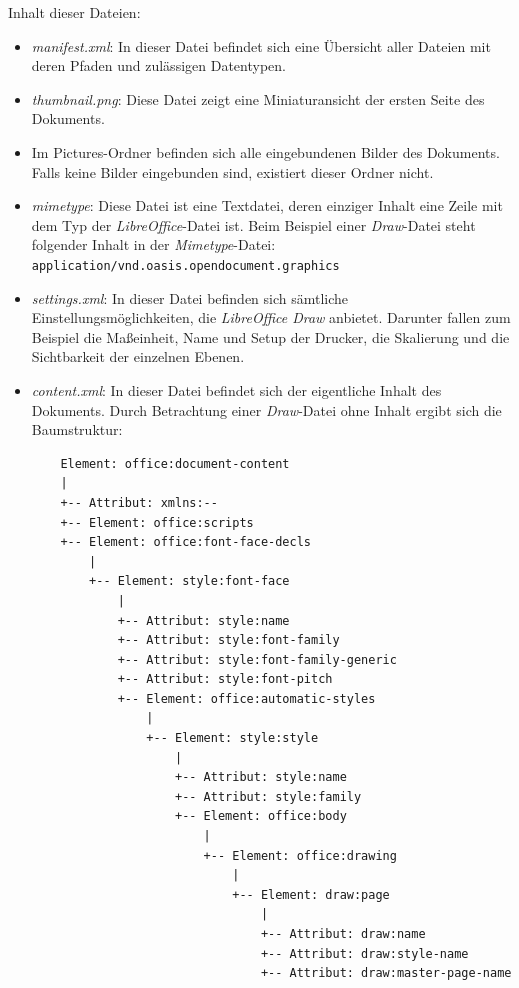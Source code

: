 \noindent
Inhalt dieser Dateien:
\hon{}
\begin{itemize}
	\item  \textit{manifest.xml}: In dieser Datei befindet sich eine Übersicht aller Dateien mit deren Pfaden und zulässigen Datentypen.
	\item \textit{thumbnail.png}: Diese Datei zeigt eine Miniaturansicht der ersten Seite des Dokuments.
	\item Im Pictures-Ordner befinden sich alle eingebundenen Bilder des Dokuments. Falls keine Bilder eingebunden sind, existiert dieser Ordner nicht. 
	\item \textit{mimetype}: Diese Datei ist eine Textdatei, deren einziger Inhalt eine Zeile mit dem Typ der \textit{LibreOffice}-Datei ist. Beim Beispiel einer \textit{Draw}-Datei steht folgender Inhalt in der \textit{Mimetype}-Datei: 
	\\
	\verb|application/vnd.oasis.opendocument.graphics|
	\item \textit{settings.xml}: In dieser Datei befinden sich sämtliche \\ Einstellungsmöglichkeiten, die \textit{LibreOffice Draw} anbietet. Darunter fallen zum Beispiel die Maßeinheit, Name und Setup der Drucker, die Skalierung und die Sichtbarkeit der einzelnen Ebenen.
	\item \textit{content.xml}: In dieser Datei befindet sich der eigentliche Inhalt des Dokuments. Durch Betrachtung einer \textit{Draw}-Datei ohne Inhalt ergibt sich die Baumstruktur:
	\begin{verbatim}
	Element: office:document-content
	|
	+-- Attribut: xmlns:--
	+-- Element: office:scripts
	+-- Element: office:font-face-decls
	    |
	    +-- Element: style:font-face
	        |
	        +-- Attribut: style:name
	        +-- Attribut: style:font-family
	        +-- Attribut: style:font-family-generic
	        +-- Attribut: style:font-pitch
	        +-- Element: office:automatic-styles
	            |
	            +-- Element: style:style
	                |
	                +-- Attribut: style:name
	                +-- Attribut: style:family
	                +-- Element: office:body
	                    |
	                    +-- Element: office:drawing
	                        |
	                        +-- Element: draw:page
	                            |
	                            +-- Attribut: draw:name
	                            +-- Attribut: draw:style-name
	                            +-- Attribut: draw:master-page-name
	\end{verbatim}
	

\end{itemize}
